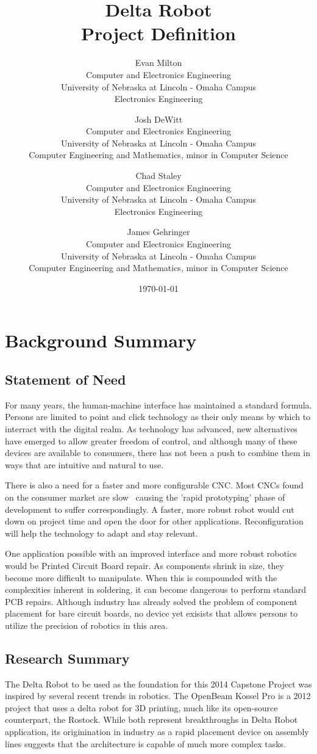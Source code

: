 \documentclass[11pt]{report}
\title{Delta Robot\\Project Definition}
\author{
Evan Milton\\
Computer and Electronics Engineering\\
University of Nebraska at Lincoln - Omaha Campus\\
Electronics Engineering
\and
Josh DeWitt\\
Computer and Electronics Engineering\\
University of Nebraska at Lincoln - Omaha Campus\\
Computer Engineering and Mathematics, minor in Computer Science
\and
Chad Staley\\
Computer and Electronics Engineering\\
University of Nebraska at Lincoln - Omaha Campus\\
Electronics Engineering
\and
James Gehringer\\
Computer and Electronics Engineering\\
University of Nebraska at Lincoln - Omaha Campus\\
Computer Engineering and Mathematics, minor in Computer Science
}
\date{\today}
\begin{document}
\maketitle

\tableofcontents

\chapter{Background Summary}
\section{Statement of Need}
\par For many years, the human-machine interface has maintained a standard formula. Persons are limited to point and click technology as their only means by which to interract with the digital realm. As technology has advanced, new alternatives have emerged to allow  greater freedom of control, and although many of these devices are available to consumers, there has not been a push to combine them in ways that are intuitive and natural to use.

\par There is also a need for a faster and more configurable CNC. Most CNCs found on the consumer market are slow~ causing the 'rapid prototyping' phase of development to suffer correspondingly. A faster, more robust robot would cut down on project time and open the door for other applications. Reconfiguration will help the technology to adapt and stay relevant.

\par One application possible with an improved interface and more robust robotics would be Printed Circuit Board repair. As components shrink in size, they become more difficult to manipulate. When this is compounded with the complexities inherent in soldering, it can become dangerous to perform standard PCB repairs. Although industry has already solved the problem of component placement for bare circuit boards, no device yet exisists that allows persons to utilize the precision of robotics in this area. 

\section{Research Summary}
\par The Delta Robot to be used as the foundation for this 2014 Capstone Project was inspired by several recent trends in robotics. The OpenBeam Kossel Pro is a 2012 project that uses a delta robot for 3D printing, much like its open-source counterpart, the Rostock. While both represent breakthroughs in Delta Robot application, its originination in industry as a rapid placement device on assembly lines suggests that the architecture is capable of much more complex tasks.
\end{document}
